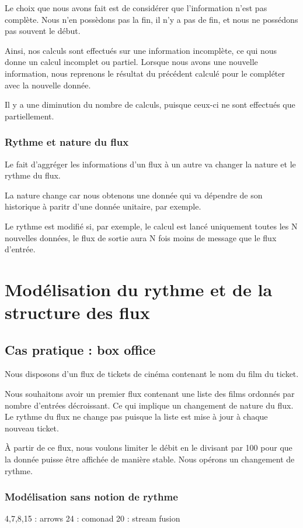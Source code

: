 \documentclass{llncs}
\begin{document}
Le choix que nous avons fait est de considérer que l'information n'est pas complète.
Nous n'en possèdons pas la fin, il n'y a pas de fin, et nous ne possédons pas
souvent le début.

Ainsi, nos calculs sont effectués sur une information incomplète, ce qui nous
donne un calcul incomplet ou partiel.
Lorsque nous avons une nouvelle information, nous reprenons le résultat du
précédent calculé pour le compléter avec la nouvelle donnée.

Il y a une diminution du nombre de calculs, puisque ceux-ci ne sont effectués
que partiellement.

\subsubsection{Rythme et nature du flux}
Le fait d'aggréger les informations d'un flux à un autre va changer la nature et
le rythme du flux.

La nature change car nous obtenons une donnée qui va dépendre de son historique
à paritr d'une donnée unitaire, par exemple.

Le rythme est modifié si, par exemple, le calcul est lancé uniquement toutes les
N nouvelles données, le flux de sortie aura N fois moins de message que le flux d'entrée.

\section{Modélisation du rythme et de la structure des flux}
\subsection{Cas pratique : box office}
Nous disposons d'un flux de tickets de cinéma contenant le nom du film du ticket.

Nous souhaitons avoir un premier flux contenant une liste des films ordonnés par
nombre d'entrées décroissant.
Ce qui implique un changement de nature du flux.
Le rythme du flux ne change pas puisque la liste est mise à jour à chaque nouveau
ticket.

À partir de ce flux, nous voulons limiter le débit en le divisant par 100 pour
que la donnée puisse être affichée de manière stable.
Nous opérons un changement de rythme.


\subsubsection{Modélisation sans notion de rythme}
4,7,8,15 : arrows
24 : comonad
20 : stream fusion
\end{document}
